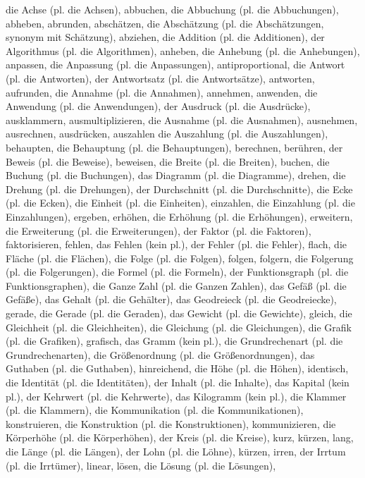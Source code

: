 die Achse (pl. die Achsen),
abbuchen,
die Abbuchung (pl. die Abbuchungen),
abheben,
abrunden,
abschätzen,
die Abschätzung (pl. die Abschätzungen, synonym mit Schätzung),
abziehen,
die Addition (pl. die Additionen),
der Algorithmus (pl. die Algorithmen),
anheben,
die Anhebung (pl. die Anhebungen),
anpassen,
die Anpassung (pl. die Anpassungen),
antiproportional,
die Antwort (pl. die Antworten),
der Antwortsatz (pl. die Antwortsätze),
antworten,
aufrunden,
die Annahme (pl. die Annahmen),
annehmen,
anwenden,
die Anwendung (pl. die Anwendungen),
der Ausdruck (pl. die Ausdrücke),
ausklammern,
ausmultiplizieren,
die Ausnahme (pl. die Ausnahmen),
ausnehmen,
ausrechnen,
ausdrücken,
auszahlen
die Auszahlung (pl. die Auszahlungen),
behaupten,
die Behauptung (pl. die Behauptungen),
berechnen,
berühren,
der Beweis (pl. die Beweise),
beweisen,
die Breite (pl. die Breiten),
buchen,
die Buchung (pl. die Buchungen),
das Diagramm (pl. die Diagramme),
drehen,
die Drehung (pl. die Drehungen),
der Durchschnitt (pl. die Durchschnitte),
die Ecke (pl. die Ecken),
die Einheit (pl. die Einheiten),
einzahlen,
die Einzahlung (pl. die Einzahlungen),
ergeben,
erhöhen,
die Erhöhung (pl. die Erhöhungen),
erweitern,
die Erweiterung (pl. die Erweiterungen),
der Faktor (pl. die Faktoren),
faktorisieren,
fehlen,
das Fehlen (kein pl.),
der Fehler (pl. die Fehler),
flach,
die Fläche (pl. die Flächen),
die Folge (pl. die Folgen),
folgen,
folgern,
die Folgerung (pl. die Folgerungen),
die Formel (pl. die Formeln),
der Funktionsgraph (pl. die Funktionsgraphen),
die Ganze Zahl (pl. die Ganzen Zahlen),
das Gefäß (pl. die Gefäße),
das Gehalt (pl. die Gehälter),
das Geodreieck (pl. die Geodreiecke),
gerade,
die Gerade (pl. die Geraden),
das Gewicht (pl. die Gewichte),
gleich,
die Gleichheit (pl. die Gleichheiten),
die Gleichung (pl. die Gleichungen),
die Grafik (pl. die Grafiken),
grafisch,
das Gramm (kein pl.),
die Grundrechenart (pl. die Grundrechenarten),
die Größenordnung (pl. die Größenordnungen),
das Guthaben (pl. die Guthaben),
hinreichend,
die Höhe (pl. die Höhen),
identisch,
die Identität (pl. die Identitäten),
der Inhalt (pl. die Inhalte),
das Kapital (kein pl.),
der Kehrwert (pl. die Kehrwerte),
das Kilogramm (kein pl.),
die Klammer (pl. die Klammern),
die Kommunikation (pl. die Kommunikationen),
konstruieren,
die Konstruktion (pl. die Konstruktionen),
kommunizieren,
die Körperhöhe (pl. die Körperhöhen),
der Kreis (pl. die Kreise),
kurz,
kürzen,
lang,
die Länge (pl. die Längen),
der Lohn (pl. die Löhne),
kürzen,
irren,
der Irrtum (pl. die Irrtümer),
linear,
lösen,
die Lösung (pl. die Lösungen),
